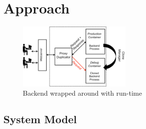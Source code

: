\section{Approach}
\label{sec:design}


\begin{figure}[t]
  \begin{center}
    \includegraphics[width=0.5\textwidth]{figs/workflow2.eps}
    \caption{Backend wrapped around with \parikshan run-time}
    \label{fig:workflow}
  \end{center}
\end{figure}



\subsection{System Model}
\label{sec:systemOverview}

